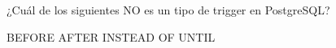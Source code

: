 \question[1] ¿Cuál de los siguientes NO es un tipo de trigger en PostgreSQL?
\begin{choices}
\choice BEFORE
\choice AFTER
\choice INSTEAD OF
\CorrectChoice UNTIL
\end{choices}
